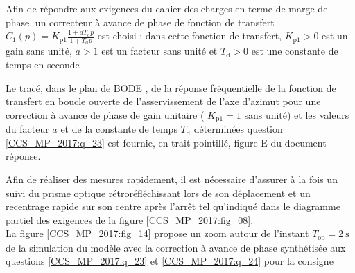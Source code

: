 Afin de répondre aux exigences du cahier des charges en terme de marge de phase, un correcteur à avance de phase de fonction de transfert $C_{1}(p)=K_{\mathrm{p} 1} \frac{1+a T_{\mathrm{d}} p}{1+T_{\mathrm{d}} p}$ est choisi : dans cette fonction de transfert, $K_{\mathrm{p} 1}>0$ est un gain sans unité, $a>1$ est un facteur sans unité et $T_{\mathrm{d}}>0$ est une constante de temps en seconde\\
\ifprof
\begin{corrige}
\end{corrige}
\else
\fi


Le tracé, dans le plan de BODE , de la réponse fréquentielle de la fonction de transfert en boucle ouverte de l'asservissement de l'axe d'azimut pour une correction à avance de phase de gain unitaire ( $K_{\mathrm{p} 1}=1$ sans unité) et les valeurs du facteur $a$ et de la constante de temps $T_{\mathrm{d}}$ déterminées question \ref{CCS_MP_2017:q_23} est fournie, en trait pointillé, figure E du document réponse.\\

\ifprof
\begin{corrige}
\end{corrige}
\else
\fi


Afin de réaliser des mesures rapidement, il est nécessaire d'assurer à la fois un suivi du prisme optique rétroréfléchissant lors de son déplacement et un recentrage rapide sur son centre après l'arrêt tel qu'indiqué dans le diagramme partiel des exigences de la figure \ref{CCS_MP_2017:fig_08}.\\
La figure \ref{CCS_MP_2017:fig_14} propose un zoom autour de l'instant $T_{\mathrm{op}}=2 \mathrm{~s}$ de la simulation du modèle avec la correction à avance de phase synthétisée aux questions \ref{CCS_MP_2017:q_23} et \ref{CCS_MP_2017:q_24} pour la consigne

